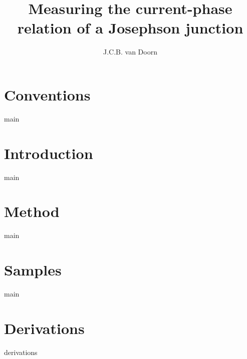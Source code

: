 \documentclass[twoside,single]{lion-msc}
\title{Measuring the current-phase relation of a Josephson junction}
\author{J.C.B. van Doorn}
\begin{document}
	\maketitle

	\tableofcontents

	\chapter*{Conventions}
	{main}
	
	\chapter{Introduction}
	{main}

	\chapter{Method}
	{main}

	\chapter{Samples}
	{main}

	\appendix
	\chapter{Derivations}
	{derivations}

	\printbibliography
\end{document}
